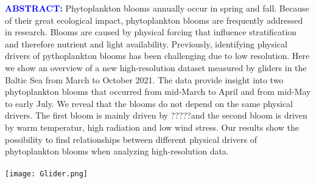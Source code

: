 \documentclass[../Main.tex]{subfiles}
\begin{document}
\begin{tcolorbox}[colback=light-orange, boxrule=0pt]
  \begin{multicols}{3}
    \textcolor{blue}{\textbf{ABSTRACT:}}
Phytoplankton blooms annually occur in spring and fall.
Because of their great ecological impact, phytoplankton blooms are frequently addressed in research.
Blooms are caused by physical forcing that influence stratification and therefore nutrient and light availability.
Previously, identifying physical drivers of pythoplankton blooms has been challenging due to low resolution.
%
Here we show an overview of a new high-resolution dataset measured by gliders in the Baltic Sea from March to October 2021.
The data provide insight into two phytoplankton blooms that occurred from mid-March to April and from mid-May to early July.
We reveal that the blooms do not depend on the same physical drivers.
The first bloom is mainly driven by ?????and the second bloom is driven by warm temperatur, high radiation and low wind stress.
Our results show the possibility to find relationships between different physical drivers of phytoplankton blooms when analyzing high-resolution data.
\ \\
\ \\
    \texttt{[image: Glider.png]}
 \end{multicols}
\end{tcolorbox}
\end{document}
